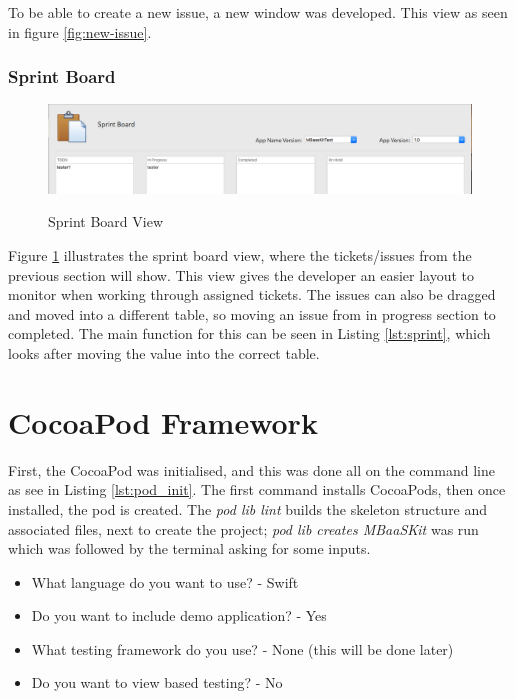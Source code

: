 To be able to create a new issue, a new window was developed. This view as seen in figure \ref{fig:new-issue}.

\subsubsection{Sprint Board}

\begin{figure}[!h]
    \caption{Sprint Board View}
    \centering
    \includegraphics[width=150mm]{images/dashboard/sprint-board}
    \label{fig:sprint-board-view}
\end{figure} 

Figure \ref{fig:sprint-board-view} illustrates the sprint board view, where the tickets/issues from the previous section will show. This view gives the developer an easier layout to monitor when working through assigned tickets. The issues can also be dragged and moved into a different table, so moving an issue from in progress section to completed. The main function for this can be seen in Listing \ref{lst:sprint}, which looks after moving the value into the correct table.



\section{CocoaPod Framework}

First, the CocoaPod was initialised, and this was done all on the command line as see in Listing \ref{lst:pod_init}. The first command installs CocoaPods, then once installed, the pod is created. The \textit{pod lib lint} builds the skeleton structure and associated files, next to create the project; \textit{pod lib creates MBaaSKit} was run which was followed by the terminal asking for some inputs.



\begin{itemize}
  \item What language do you want to use?
  - Swift
  \item Do you want to include demo application?
  - Yes
  \item What testing framework do you use?
  - None (this will be done later)
  \item Do you want to view based testing?
  - No
\end{itemize}


